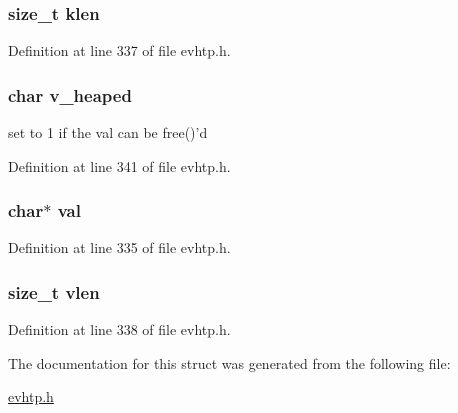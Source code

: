 \hypertarget{structevhtp__kv__s_a70d958290b8b8ebaff45365d4e5b9e54}{
\subsubsection[{klen}]{\setlength{\rightskip}{0pt plus 5cm}size\-\_\-t {\bf klen}}}\label{structevhtp__kv__s_a70d958290b8b8ebaff45365d4e5b9e54}


\-Definition at line 337 of file evhtp.\-h.

\hypertarget{structevhtp__kv__s_a220b69df8f7b820814ebda4c2df899d8}{
\subsubsection[{v\-\_\-heaped}]{\setlength{\rightskip}{0pt plus 5cm}char {\bf v\-\_\-heaped}}}\label{structevhtp__kv__s_a220b69df8f7b820814ebda4c2df899d8}
set to 1 if the val can be free()'d 

\-Definition at line 341 of file evhtp.\-h.

\hypertarget{structevhtp__kv__s_a1d80a43cb41e5b550d4563dd10d302bc}{
\subsubsection[{val}]{\setlength{\rightskip}{0pt plus 5cm}char$\ast$ {\bf val}}}\label{structevhtp__kv__s_a1d80a43cb41e5b550d4563dd10d302bc}


\-Definition at line 335 of file evhtp.\-h.

\hypertarget{structevhtp__kv__s_ac59966c92d67690ef79403b9b2feab88}{
\subsubsection[{vlen}]{\setlength{\rightskip}{0pt plus 5cm}size\-\_\-t {\bf vlen}}}\label{structevhtp__kv__s_ac59966c92d67690ef79403b9b2feab88}


\-Definition at line 338 of file evhtp.\-h.



\-The documentation for this struct was generated from the following file\-:\begin{DoxyCompactItemize}
\item 
\hyperlink{evhtp_8h}{evhtp.\-h}\end{DoxyCompactItemize}
